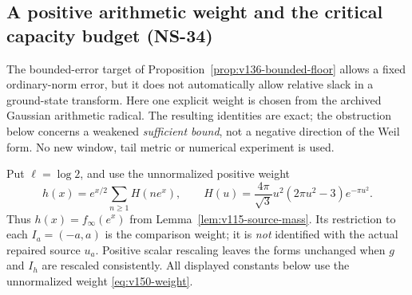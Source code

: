 \subsection*{A positive arithmetic weight and the critical capacity budget (NS-34)}

The bounded-error target of Proposition~\ref{prop:v136-bounded-floor}
allows a fixed ordinary-norm error, but it does not automatically allow
relative slack in a ground-state transform. Here one explicit weight is
chosen from the archived Gaussian arithmetic radical. The resulting
identities are exact; the obstruction below concerns a weakened
\emph{sufficient bound}, not a negative direction of the Weil form.
No new window, tail metric or numerical experiment is used.

Put $\ell=\log2$, and use the unnormalized positive weight
\begin{equation}\label{eq:v150-weight}
 h(x)=e^{x/2}\sum_{n\ge1}H(ne^x),\qquad
 H(u)=\frac{4\pi}{\sqrt3}u^2(2\pi u^2-3)e^{-\pi u^2}.
\end{equation}
Thus $h(x)=f_\infty(e^x)$ from Lemma~\ref{lem:v115-source-mass}.
Its restriction to each $I_a=(-a,a)$ is the comparison weight; it is
\emph{not} identified with the actual repaired source $u_a$. Positive
scalar rescaling leaves the forms unchanged when $g$ and $I_h$ are
rescaled consistently. All displayed constants below use the
unnormalized weight \eqref{eq:v150-weight}.

